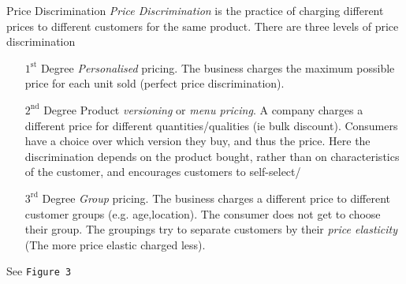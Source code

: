 \documentclass[11pt,a4paper]{article}
\begin{document}
  \begin{definition}{Price Discrimination}
    \textit{Price Discrimination} is the practice of charging different prices to different customers for the same product. There are three levels of price discrimination
    \begin{itemize}
      \item[$1^\text{st}$ Degree]  \textit{Personalised} pricing. The business charges the maximum possible price for each unit sold (perfect price discrimination).
      \item[$2^\text{nd}$ Degree]  Product \textit{versioning} or \textit{menu pricing}. A company charges a different price for different quantities/qualities (ie bulk discount). Consumers have a choice over which version they buy, and thus the price. Here the discrimination depends on the product bought, rather than on characteristics of the customer, and encourages customers to self-select/
      \item[$3^\text{rd}$ Degree]  \textit{Group} pricing. The business charges a different price to different customer groups (e.g. age,location). The consumer does not get to choose their group. The groupings try to separate customers by their \textit{price elasticity} (The more price elastic charged less).
    \end{itemize}
    See \texttt{Figure 3}


\end{definition}
\end{document}

